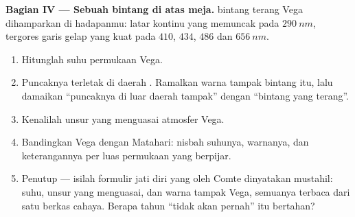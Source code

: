 \begin{problem}
\medskip
\noindent\textbf{Bagian IV --- Sebuah bintang di atas meja.}
 bintang terang Vega dihamparkan di hadapanmu: latar kontinu
yang memuncak pada $\qty{290}{nm}$, tergores garis gelap yang kuat pada
$410$, $434$, $486$ dan $\qty{656}{nm}$.
\begin{enumerate}[resume]
  \item Hitunglah suhu permukaan Vega.
  \item Puncaknya terletak di daerah . Ramalkan warna tampak
        bintang itu, lalu damaikan ``puncaknya di luar daerah tampak''
        dengan ``bintang yang terang''.
  \item Kenalilah unsur yang menguasai atmosfer Vega.
  \item Bandingkan Vega dengan Matahari: nisbah suhunya, warnanya, dan
        keterangannya per  luas permukaan yang berpijar.
  \item Penutup --- isilah formulir jati diri yang oleh Comte
        dinyatakan mustahil: suhu, unsur yang menguasai, dan warna
        tampak Vega, semuanya terbaca dari satu berkas cahaya. Berapa
        tahun ``tidak akan pernah'' itu bertahan?
\end{enumerate}
\end{problem}
